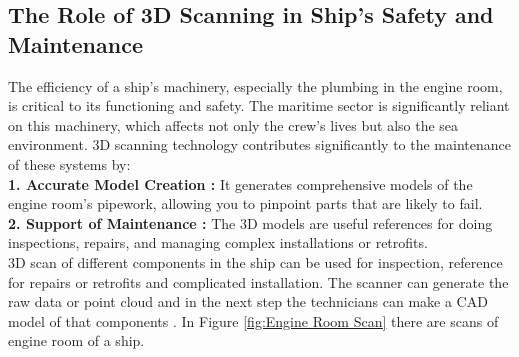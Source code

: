 \subsection{The Role of 3D Scanning in Ship's Safety and Maintenance}
The efficiency of a ship's machinery, especially the plumbing in the engine room, is critical to its functioning and safety. The maritime sector is significantly reliant on this machinery, which affects not only the crew's lives but also the sea environment. 3D scanning technology contributes significantly to the maintenance of these systems by:\\

\textbf{1. Accurate Model Creation :} It generates comprehensive models of the engine room's pipework, allowing you to pinpoint parts that are likely to fail.\\

\textbf{2. Support of Maintenance :} The 3D models are useful references for doing inspections, repairs, and managing complex installations or retrofits.\\

\noindent 3D scan of different components in the ship can be used for inspection, reference for repairs or retrofits and complicated installation. The scanner can generate the raw data or point cloud and in the next step the technicians can make a CAD model of that components \cite{3DScan}. In Figure \ref{fig:Engine Room Scan} there are scans of engine room of a ship. 



